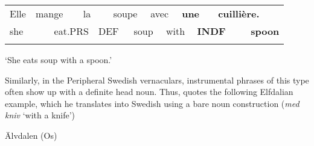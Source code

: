 \begin{tabular}{llllllllllllll}
\lsptoprule
Elle & \multicolumn{2}{l}{mange

} & \multicolumn{2}{l}{la

} & \multicolumn{2}{l}{soupe

} & \multicolumn{2}{l}{avec

} & \multicolumn{2}{l}{{\bfseries une}

} & \multicolumn{2}{l}{{\bfseries cuillière.}

} & \\
\multicolumn{2}{l}{she

} & \multicolumn{2}{l}{eat.PRS

} & \multicolumn{2}{l}{DEF

} & \multicolumn{2}{l}{soup

} & \multicolumn{2}{l}{with

} & \multicolumn{2}{l}{{\bfseries INDF}

} & \multicolumn{2}{l}{{\bfseries spoon}

}\\
\lspbottomrule
\end{tabular}

\begin{styleTranslation}
‘She eats soup with a spoon.’

\end{styleTranslation}

\begin{styleBodyTextFirst}
Similarly, in the Peripheral Swedish vernaculars, instrumental phrases of this type often show up with a definite head noun. Thus, \citet[126]{Levander1909} quotes the following Elfdalian example, which he translates into Swedish using a bare noun construction (\textit{med kniv} ‘with a knife’)

\end{styleBodyTextFirst}

\begin{listWWNumileveli}
\item 

\begin{styleExample}
Älvdalen (Os)

\end{styleExample}

\end{listWWNumileveli}

